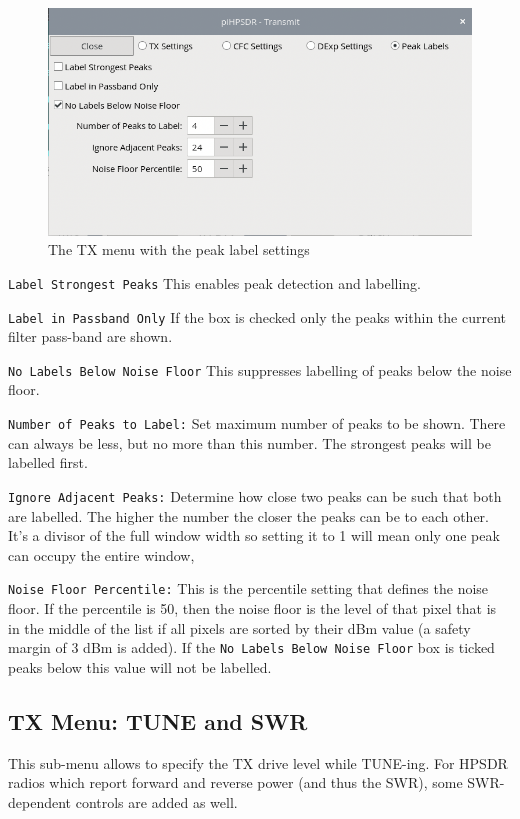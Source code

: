 \documentclass[12pt]{book}
\def\rett#1{\texttt{\color{red}#1}}
\begin{document}
\begin{figure}[ht]
\center
\includegraphics[scale=0.45]{TX_PEAK.png}
\caption{The TX menu with the peak label settings}
\label{fig:TXPeakMenu}
\end{figure}

\rett{Label Strongest Peaks} This enables peak detection and labelling.

\rett{Label in Passband Only} If the box is checked only the peaks within the
current filter pass-band  are shown.

\rett{No Labels Below Noise Floor} This suppresses labelling of peaks below the noise floor.

\rett{Number of Peaks to Label:} Set maximum number of peaks to be shown. There can always be less,
but no more than this number. The strongest peaks will be labelled first.

\rett{Ignore Adjacent Peaks:} Determine how close two peaks can be such that both are labelled.
The higher the number the closer the peaks can be to each other. It's a divisor of the
full window width so setting it to 1 will mean only one peak can occupy the entire window,

\rett{Noise Floor Percentile:} This is the percentile setting that defines the noise floor. If the
percentile is 50, then the noise floor is the level of that pixel that is in the middle of the list
if all pixels are sorted by their dBm value (a safety margin of 3 dBm is added).
If the \rett{No Labels Below Noise Floor} box is ticked
peaks below this value will not be labelled.

\subsection{TX Menu: TUNE and SWR}
This sub-menu allows to specify the TX drive level while TUNE-ing. For HPSDR radios which report forward
and reverse power (and thus the SWR), some SWR-dependent controls are added as well.
\end{document}

